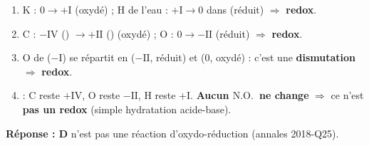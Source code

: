 \documentclass[11pt,a4paper]{article}
\newcommand{\NO}{\ensuremath{\mathrm{N.O.}}}
\begin{document}
\begin{corr}
\begin{enumerate}[label=\textbf{\Alph*.},leftmargin=2.2em,topsep=2pt,itemsep=2pt]
  \item K : $0\to+\mathrm{I}$ (oxydé) ; H de l'eau : $+\mathrm{I}\to 0$ dans  (réduit) $\Rightarrow$ \textbf{redox}.
  \item C : $-\mathrm{IV}$ () $\to +\mathrm{II}$ () (oxydé) ; O : $0\to-\mathrm{II}$ (réduit) $\Rightarrow$ \textbf{redox}.
  \item O de  ($-\mathrm{I}$) se répartit en  ($-\mathrm{II}$, réduit) et  ($0$, oxydé) :
        c'est une \textbf{dismutation} $\Rightarrow$ \textbf{redox}.
  \item {} : C reste $+\mathrm{IV}$, O reste $-\mathrm{II}$, H reste $+\mathrm{I}$.
        \textbf{Aucun \NO\ ne change} $\Rightarrow$ ce n'est \textbf{pas un redox} (simple hydratation acide-base).
\end{enumerate}
\textbf{Réponse : D} n'est pas une réaction d'oxydo-réduction (annales 2018-Q25).
\end{corr}
\end{document}
